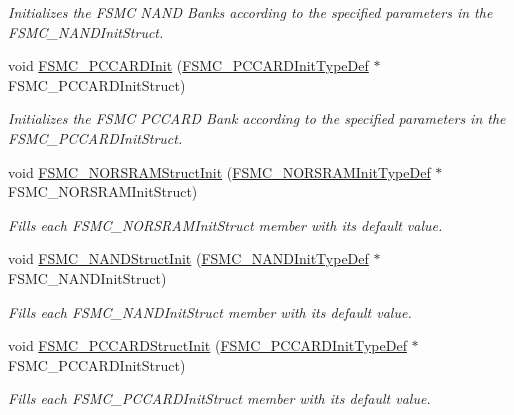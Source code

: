 \begin{DoxyCompactItemize}
\begin{DoxyCompactList}\small\item\em Initializes the F\+S\+MC N\+A\+ND Banks according to the specified parameters in the F\+S\+M\+C\+\_\+\+N\+A\+N\+D\+Init\+Struct. \end{DoxyCompactList}\item 
void \hyperlink{group___f_s_m_c___private___functions_gacee1351363e7700a296faa1734a910aa}{F\+S\+M\+C\+\_\+\+P\+C\+C\+A\+R\+D\+Init} (\hyperlink{struct_f_s_m_c___p_c_c_a_r_d_init_type_def}{F\+S\+M\+C\+\_\+\+P\+C\+C\+A\+R\+D\+Init\+Type\+Def} $\ast$F\+S\+M\+C\+\_\+\+P\+C\+C\+A\+R\+D\+Init\+Struct)
\begin{DoxyCompactList}\small\item\em Initializes the F\+S\+MC P\+C\+C\+A\+RD Bank according to the specified parameters in the F\+S\+M\+C\+\_\+\+P\+C\+C\+A\+R\+D\+Init\+Struct. \end{DoxyCompactList}\item 
void \hyperlink{group___f_s_m_c___private___functions_gaf33e6dfc34f62d16a0cb416de9e83d28}{F\+S\+M\+C\+\_\+\+N\+O\+R\+S\+R\+A\+M\+Struct\+Init} (\hyperlink{struct_f_s_m_c___n_o_r_s_r_a_m_init_type_def}{F\+S\+M\+C\+\_\+\+N\+O\+R\+S\+R\+A\+M\+Init\+Type\+Def} $\ast$F\+S\+M\+C\+\_\+\+N\+O\+R\+S\+R\+A\+M\+Init\+Struct)
\begin{DoxyCompactList}\small\item\em Fills each F\+S\+M\+C\+\_\+\+N\+O\+R\+S\+R\+A\+M\+Init\+Struct member with its default value. \end{DoxyCompactList}\item 
void \hyperlink{group___f_s_m_c___private___functions_ga8283ad94ad8e83d49d5b77d1c7e17862}{F\+S\+M\+C\+\_\+\+N\+A\+N\+D\+Struct\+Init} (\hyperlink{struct_f_s_m_c___n_a_n_d_init_type_def}{F\+S\+M\+C\+\_\+\+N\+A\+N\+D\+Init\+Type\+Def} $\ast$F\+S\+M\+C\+\_\+\+N\+A\+N\+D\+Init\+Struct)
\begin{DoxyCompactList}\small\item\em Fills each F\+S\+M\+C\+\_\+\+N\+A\+N\+D\+Init\+Struct member with its default value. \end{DoxyCompactList}\item 
void \hyperlink{group___f_s_m_c___private___functions_ga7a64ba0e0545b3f1913c9d1d28c05e62}{F\+S\+M\+C\+\_\+\+P\+C\+C\+A\+R\+D\+Struct\+Init} (\hyperlink{struct_f_s_m_c___p_c_c_a_r_d_init_type_def}{F\+S\+M\+C\+\_\+\+P\+C\+C\+A\+R\+D\+Init\+Type\+Def} $\ast$F\+S\+M\+C\+\_\+\+P\+C\+C\+A\+R\+D\+Init\+Struct)
\begin{DoxyCompactList}\small\item\em Fills each F\+S\+M\+C\+\_\+\+P\+C\+C\+A\+R\+D\+Init\+Struct member with its default value. \end{DoxyCompactList}\item 

\end{DoxyCompactItemize}
